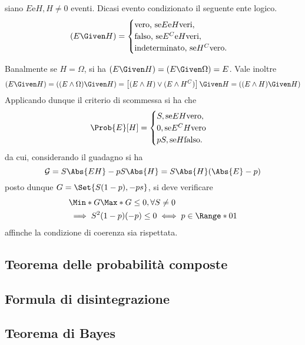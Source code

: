 \documentclass{subfiles}
\begin{document}
\begin{Definition*}
    siano $E \text{e} H, H \neq 0$ eventi.
    Dicasi evento condizionato il seguente ente logico.
    $$(E \Given H) = \begin{cases}
            \text{vero, se} E \text{e} H \text{veri},      \\
            \text{falso, se} E^{C} \text{e} H \text{veri}, \\
            \text{indeterminato, se} H^{C} \text{vero.}
        \end{cases}$$
\end{Definition*}
Banalmente se $H = \Omega$, si ha $(E \Given H) = (E \Given \Omega) = E$.
Vale inoltre
$$
    (E \Given H) = ((E \land \Omega) \Given H) = \left[(E \land H) \lor (E \land H^{C})\right] \Given H = ((E \land H) \Given H)
$$
Applicando dunque il criterio di scommessa si ha che
$$
    \Prob{E}[H] = \begin{cases}
        S, \text{se} EH \text{vero},    \\
        0, \text{se} E^{C}H \text{vero} \\
        pS, \text{se} H \text{falso.}
    \end{cases}$$
da cui, considerando il guadagno si ha
$$
    \mathcal{G} = S \Abs{EH} - pS\Abs{H} = S\Abs{H} (\Abs{E} - p)
$$
posto dunque $G = \Set{S(1 - p), -ps}$, si deve verificare
$$\begin{aligned}
         & \Min*{G}\Max*{G} \le 0, \forall S \neq 0                 \\
         & \implies S^{2}(1 - p)(-p) \le 0 \iff p \in \Range*{0}{1}
    \end{aligned}$$
affinche la condizione di coerenza sia rispettata.

\subsection{Teorema delle probabilità composte}


\subsection{Formula di disintegrazione}

\clearpage

\subsection{Teorema di Bayes}

\clearpage
\end{document}
